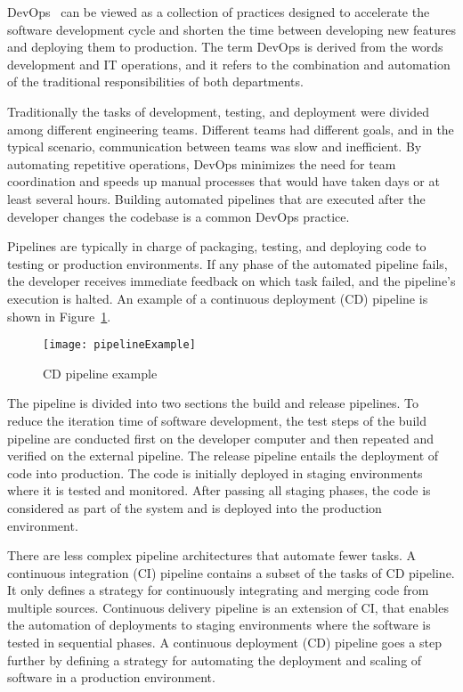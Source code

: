 DevOps~\cite{devops} can be viewed as a collection of practices designed to accelerate the software development cycle and shorten the time between developing new features and deploying them to production.
The term DevOps is derived from the words development and IT operations, and it refers to the combination and automation of the traditional responsibilities of both departments.

Traditionally the tasks of development, testing, and deployment were divided among different engineering teams.
Different teams had different goals, and in the typical scenario, communication between teams was slow and inefficient.
By automating repetitive operations, DevOps minimizes the need for team coordination and speeds up manual processes that would have taken days or at least several hours.
Building automated pipelines that are executed after the developer changes the codebase is a common DevOps practice.

Pipelines are typically in charge of packaging, testing, and deploying code to testing or production environments.
If any phase of the automated pipeline fails, the developer receives immediate feedback on which task failed, and the pipeline's execution is halted.
An example of a continuous deployment (CD) pipeline is shown in Figure~\ref{fig:pipeline_example}.

\begin{figure}[htbp]
    \centering
    \texttt{[image: pipelineExample]}
    \caption{CD pipeline example}
    \label{fig:pipeline_example}
\end{figure}

The pipeline is divided into two sections the build and release pipelines.
To reduce the iteration time of software development,
the test steps of the build pipeline are conducted first on the developer computer and then repeated and verified on the external pipeline.
The release pipeline entails the deployment of code into production.
The code is initially deployed in staging environments where it is tested and monitored.
After passing all staging phases, the code is considered as part of the system and is deployed into the production environment.

There are less complex pipeline architectures that automate fewer tasks.
A continuous integration (CI) pipeline contains a subset of the tasks of CD pipeline.
It only defines a strategy for continuously integrating and merging code from multiple sources.
Continuous delivery pipeline is an extension of CI, that enables the automation of deployments to staging environments where the software is tested in sequential phases.
A continuous deployment (CD) pipeline goes a step further by defining a strategy for automating the deployment and scaling of software in a production environment.




